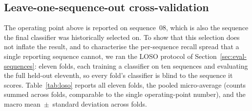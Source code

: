 \subsection{Leave-one-sequence-out cross-validation}
\label{sec:eval-loso}

The operating point above is reported on sequence~08, which is also the sequence
the final classifier was historically selected on. To show that this selection
does not inflate the result, and to characterise the per-sequence recall spread
that a single reporting sequence cannot, we ran the LOSO protocol of
Section~\ref{sec:eval-sequences}: eleven folds, each training a classifier on ten
sequences and evaluating the full held-out eleventh, so every fold's classifier
is blind to the sequence it scores. Table~\ref{tab:loso} reports all eleven folds,
the pooled micro-average (counts summed across folds, comparable to the single
operating-point number), and the macro mean~$\pm$~standard deviation across folds.

